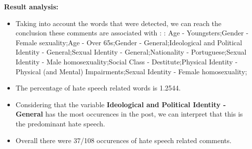 \documentclass[11pt]{article}
\begin{document}
\textbf{\Large Result analysis:}

\begin{itemize}\item Taking into account the words that were detected, we can reach the conclusion these comments are associated with : : Age - Youngsters;Gender - Female sexuality;Age - Over 65s;Gender - General;Ideological and Political Identity - General;Sexual Identity - General;Nationality - Portuguese;Sexual Identity - Male homosexuality;Social Class - Destitute;Physical Identity - Physical (and Mental) Impairments;Sexual Identity - Female homosexuality;%

\item The percentage of hate speech related words is 1.2544.

\item Considering that the variable \textbf{Ideological and Political Identity - General} has the most occurences in the post, we can interpret that this is the predominant hate speech.

\item Overall there were 37/108 occurences of hate speech related comments.\end{itemize}
\end{document}
